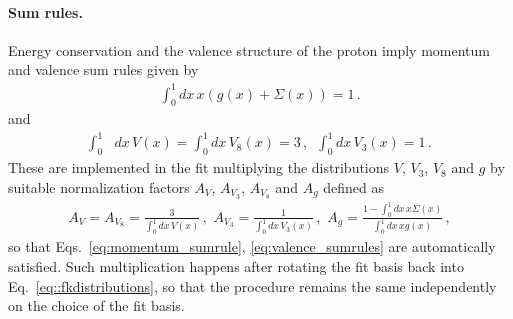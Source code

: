 \paragraph{Sum rules.}
Energy conservation and the valence structure of the proton imply momentum and valence sum rules
given by 
\begin{align}
    \label{eq:momentum_sumrule}
    \int_0^1 dx\, x\left(g\left(x\right) + \Sigma\left(x\right)\right) = 1\,. 
\end{align}
and
\begin{align}
    \label{eq:valence_sumrules}
    \int_0^1& dx\, V\left(x\right) = \int_0^1 dx\, V_8\left(x\right) = 3\,,   \,\,\,
    \int_0^1 dx\, V_3\left(x\right) = 1\,.
\end{align} 
These are implemented in the fit multiplying the distributions $V$, $V_3$, $V_8$ and $g$ by suitable normalization factors
$A_V$, $A_{V_3}$, $A_{V_8}$ and $A_g$ defined as
\begin{align}
    A_V = A_{V_8} = \frac{3}{\int_0^1 dx\, V\left(x\right)}\,,\,\,
    A_{V_3} = \frac{1}{\int_0^1 dx\, V_3\left(x\right)}\,,\,\,
    A_g = \frac{1 - \int_0^1 dx\, x \Sigma\left(x\right)}{\int_0^1 dx\, x g\left(x\right)}\,,
\end{align} 
so that Eqs.~\eqref{eq:momentum_sumrule}, \eqref{eq:valence_sumrules} are automatically
satisfied.
Such multiplication happens after rotating the fit basis back into Eq.~\eqref{eq::fkdistributions},
so that the procedure remains the same independently on the choice of the fit basis.


